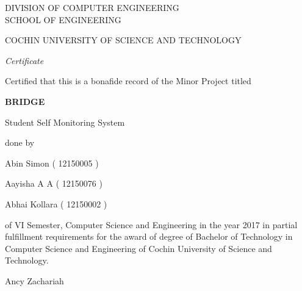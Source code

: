 
\vspace*{\fill}

\begin{center}

\large
DIVISION OF COMPUTER ENGINEERING\\
SCHOOL OF ENGINEERING\\

\hspace{1em}

COCHIN UNIVERSITY OF SCIENCE AND TECHNOLOGY\\

\hspace{1em}

\emph{\LARGE Certificate}

\hspace{1em}

\normalsize
Certified that this is a bonafide record of the Minor Project titled

\hspace{1em}

\Large{\bfseries{BRIDGE}}

\normalsize
Student Self Monitoring System

\hspace{1em}

done by

\hspace{1em}

\large
Abin Simon ( 12150005 )

\large
Aayisha A A ( 12150076 )

\large
Abhai Kollara ( 12150002 )

\hspace{1em}

\normalsize
of VI Semester, Computer Science and Engineering in the year 2017 in partial fulfillment requirements for the award of degree of Bachelor of Technology in Computer Science and Engineering of Cochin University of Science and Technology.

\hspace{1em}
\vspace{5em}

\begin{minipage}[b]{0.33333\textwidth}
\raggedright
Ancy Zachariah


\end{minipage}
\end{center}
